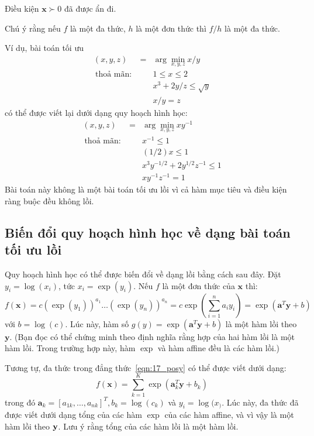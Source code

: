 Điều kiện $\mathbf{x} \succ 0$ đã được ẩn đi.

Chú ý rằng nếu $f$ là một đa thức, $h$ là một đơn thức thì $f/h$ là một đa thức.

Ví dụ, bài toán tối ưu
\begin{eqnarray}
\nonumber
(x, y, z)    &=& \arg\min_{x, y, z} x/y                          \\\
\text{thoả mãn:}~ && 1 \leq x \leq 2 \\\
\nonumber
&& x^3 + 2y/z \leq \sqrt{y} \\\
\nonumber
&& x/y = z
\end{eqnarray}
có thể được viết lại dưới dạng quy hoạch hình học:
\begin{eqnarray}
\nonumber
(x, y, z)    &=& \arg\min_{x, y, z} xy ^{-1}                        \\\
\text{thoả mãn:}~ && x^{-1} \leq 1 \\\
\nonumber
&& (1/2)x \leq 1 \\\
\nonumber
&& x^3y^{-1/2} + 2y^{1/2}z^{-1} \leq 1 \\\
\nonumber
&& xy^{-1}z^{-1} = 1
\end{eqnarray}
Bài toán này không là một bài toán tối ưu lồi vì cả hàm mục tiêu và điều kiện ràng buộc đều không lồi.


\subsection{Biến đổi quy hoạch hình học về dạng bài toán tối ưu lồi}
Quy hoạch hình học có thể được biến đổi về dạng lồi bằng cách sau đây. Đặt $y_i = \log(x_i)$,
tức $x_i = \exp({y_i})$. Nếu $f$ là một đơn thức của
$\mathbf{x}$ thì:
\begin{equation*}
f(\mathbf{x}) = c(\exp({y_1}))^{a_1} \dots (\exp({y_n}))^{a_n} =
c\exp\left(\sum_{i=1}^n a_iy_i\right) = \exp({\mathbf{a}^T\mathbf{y} + b})
\end{equation*}
với $b = \log(c)$. Lúc này, hàm số $g(y) = \exp({\mathbf{a}^T\mathbf{y} + b})$ là một hàm lồi theo $\mathbf{y}$. (Bạn đọc có thể chứng minh theo định nghĩa rằng hợp của hai hàm lồi là một hàm lồi. Trong trường hợp này, hàm $\exp$ và hàm {affine} đều là các hàm lồi.)

Tương tự, đa thức trong đẳng thức~\eqref{eqn:17_posy} có thể
được viết dưới dạng:
\begin{equation*}
f(\mathbf{x}) = \sum_{k = 1}^K \exp(\mathbf{a}_k^T\mathbf{y} + b_k)
\end{equation*}
trong đó $\mathbf{a}_k = [a_{1k}, \dots, a_{nk}]^T, b_k = \log(c_k)$ và $y_i =
\log(x_)$. Lúc này, đa thức đã được viết dưới dạng tổng của các hàm
$\exp$ của các hàm {affine}, và vì vậy là một hàm lồi theo $\mathbf{y}$. Lưu ý rằng tổng của các hàm lồi là một hàm lồi.

